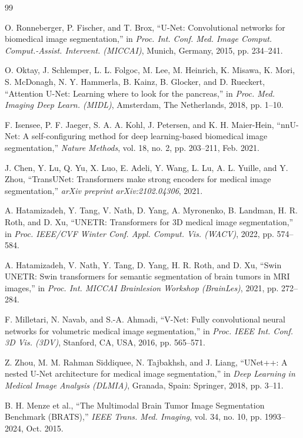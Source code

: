 \documentclass[journal,onecolumn,10pt]{IEEEtran}
\begin{document}
\begin{thebibliography}{99}

O. Ronneberger, P. Fischer, and T. Brox, ``U-Net: Convolutional networks for biomedical image segmentation,'' in \textit{Proc. Int. Conf. Med. Image Comput. Comput.-Assist. Intervent. (MICCAI)}, Munich, Germany, 2015, pp. 234--241.

O. Oktay, J. Schlemper, L. L. Folgoc, M. Lee, M. Heinrich, K. Misawa, K. Mori, S. McDonagh, N. Y. Hammerla, B. Kainz, B. Glocker, and D. Rueckert, ``Attention U-Net: Learning where to look for the pancreas,'' in \textit{Proc. Med. Imaging Deep Learn. (MIDL)}, Amsterdam, The Netherlands, 2018, pp. 1--10.

F. Isensee, P. F. Jaeger, S. A. A. Kohl, J. Petersen, and K. H. Maier-Hein, ``nnU-Net: A self-configuring method for deep learning-based biomedical image segmentation,'' \textit{Nature Methods}, vol. 18, no. 2, pp. 203--211, Feb. 2021.

J. Chen, Y. Lu, Q. Yu, X. Luo, E. Adeli, Y. Wang, L. Lu, A. L. Yuille, and Y. Zhou, ``TransUNet: Transformers make strong encoders for medical image segmentation,'' \textit{arXiv preprint arXiv:2102.04306}, 2021.

A. Hatamizadeh, Y. Tang, V. Nath, D. Yang, A. Myronenko, B. Landman, H. R. Roth, and D. Xu, ``UNETR: Transformers for 3D medical image segmentation,'' in \textit{Proc. IEEE/CVF Winter Conf. Appl. Comput. Vis. (WACV)}, 2022, pp. 574--584.

A. Hatamizadeh, V. Nath, Y. Tang, D. Yang, H. R. Roth, and D. Xu, ``Swin UNETR: Swin transformers for semantic segmentation of brain tumors in MRI images,'' in \textit{Proc. Int. MICCAI Brainlesion Workshop (BrainLes)}, 2021, pp. 272--284.

F. Milletari, N. Navab, and S.-A. Ahmadi, ``V-Net: Fully convolutional neural networks for volumetric medical image segmentation,'' in \textit{Proc. IEEE Int. Conf. 3D Vis. (3DV)}, Stanford, CA, USA, 2016, pp. 565--571.

Z. Zhou, M. M. Rahman Siddiquee, N. Tajbakhsh, and J. Liang, ``UNet++: A nested U-Net architecture for medical image segmentation,'' in \textit{Deep Learning in Medical Image Analysis (DLMIA)}, Granada, Spain: Springer, 2018, pp. 3--11.

B. H. Menze et al., ``The Multimodal Brain Tumor Image Segmentation Benchmark (BRATS),'' \textit{IEEE Trans. Med. Imaging}, vol. 34, no. 10, pp. 1993--2024, Oct. 2015.


\end{thebibliography}
\end{document}
